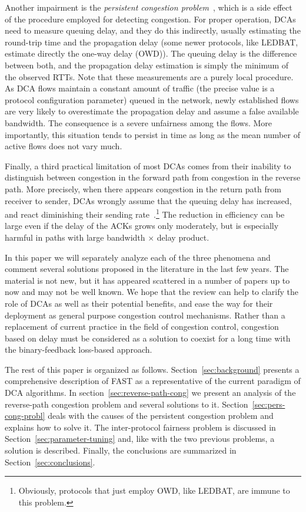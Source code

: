 \documentclass[english,times]{ettauth}
\begin{document}
Another impairment is the \emph{persistent congestion
  problem}~\cite{Wei06,Hengartner00,Rperez10}, which is a side effect of the
procedure employed for detecting congestion. For proper operation, DCAs need
to measure queuing delay, and they do this indirectly, usually estimating the
round-trip time and the propagation delay (some newer protocols, like LEDBAT,
estimate directly the one-way delay (OWD)). The queuing delay is the
difference between both, and the propagation delay estimation is simply the
minimum of the observed RTTs. Note that these measurements are a purely local
procedure. As DCA flows maintain a constant amount of traffic (the precise
value is a protocol configuration parameter) queued in the network, newly
established flows are very likely to overestimate the propagation delay and
assume a false available bandwidth. The consequence is a severe unfairness
among the flows. More importantly, this situation tends to persist in time as
long as the mean number of active flows does not vary much.

Finally, a third practical limitation of most DCAs comes from their inability
to distinguish between congestion in the forward path from congestion in the
reverse path. More precisely, when there appears congestion in the return path
from receiver to sender, DCAs wrongly assume that the queuing delay has
increased, and react diminishing their sending
rate~\cite{Fu03,Chan03,Liu05,Herreria07}.\footnote{Obviously, protocols that
  just employ OWD, like LEDBAT, are immune to this problem.} The reduction in
efficiency can be large even if the delay of the ACKs grows only moderately,
but is especially harmful in paths with large bandwidth $\times$ delay
product.

In this paper we will separately analyze each of the three phenomena and
comment several solutions proposed in the literature in the last few
years. The material is not new, but it has appeared scattered in a number of
papers up to now and may not be well known.  We hope that the review can help
to clarify the role of DCAs as well as their potential benefits, and ease the
way for their deployment as general purpose congestion control
mechanisms. Rather than a replacement of current practice in the field of
congestion control, congestion based on delay must be considered as a solution
to coexist for a long time with the binary-feedback loss-based approach.

The rest of this paper is organized as follows. Section~\ref{sec:background}
presents a comprehensive description of FAST as a representative of the
current paradigm of DCA algorithms. In section~\ref{sec:reverse-path-cong} we
present an analysis of the reverse-path congestion problem and several
solutions to it.  Section~\ref{sec:pers-cong-probl} deals with the causes of
the persistent congestion problem and explains how to solve it. The
inter-protocol fairness problem is discussed in
Section~\ref{sec:parameter-tuning} and, like with the two previous problems, a
solution is described. Finally, the conclusions are summarized in
Section~\ref{sec:conclusions}.
\end{document}
